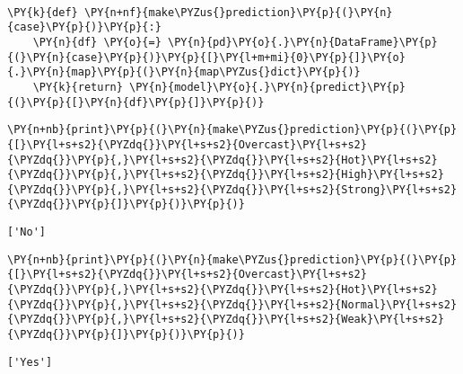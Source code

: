     \begin{center}
    \end{center}
    { \hspace*{\fill} \\}
    
    \begin{tcolorbox}[breakable, size=fbox, boxrule=1pt, pad at break*=1mm,colback=cellbackground, colframe=cellborder]
\begin{Verbatim}[commandchars=\\\{\}]
\PY{k}{def} \PY{n+nf}{make\PYZus{}prediction}\PY{p}{(}\PY{n}{case}\PY{p}{)}\PY{p}{:}
    \PY{n}{df} \PY{o}{=} \PY{n}{pd}\PY{o}{.}\PY{n}{DataFrame}\PY{p}{(}\PY{n}{case}\PY{p}{)}\PY{p}{[}\PY{l+m+mi}{0}\PY{p}{]}\PY{o}{.}\PY{n}{map}\PY{p}{(}\PY{n}{map\PYZus{}dict}\PY{p}{)}
    \PY{k}{return} \PY{n}{model}\PY{o}{.}\PY{n}{predict}\PY{p}{(}\PY{p}{[}\PY{n}{df}\PY{p}{]}\PY{p}{)}
\end{Verbatim}
\end{tcolorbox}

    \begin{tcolorbox}[breakable, size=fbox, boxrule=1pt, pad at break*=1mm,colback=cellbackground, colframe=cellborder]
\begin{Verbatim}[commandchars=\\\{\}]
\PY{n+nb}{print}\PY{p}{(}\PY{n}{make\PYZus{}prediction}\PY{p}{(}\PY{p}{[}\PY{l+s+s2}{\PYZdq{}}\PY{l+s+s2}{Overcast}\PY{l+s+s2}{\PYZdq{}}\PY{p}{,}\PY{l+s+s2}{\PYZdq{}}\PY{l+s+s2}{Hot}\PY{l+s+s2}{\PYZdq{}}\PY{p}{,}\PY{l+s+s2}{\PYZdq{}}\PY{l+s+s2}{High}\PY{l+s+s2}{\PYZdq{}}\PY{p}{,}\PY{l+s+s2}{\PYZdq{}}\PY{l+s+s2}{Strong}\PY{l+s+s2}{\PYZdq{}}\PY{p}{]}\PY{p}{)}\PY{p}{)}
\end{Verbatim}
\end{tcolorbox}

    \begin{Verbatim}[commandchars=\\\{\}]
['No']
    \end{Verbatim}

    \begin{tcolorbox}[breakable, size=fbox, boxrule=1pt, pad at break*=1mm,colback=cellbackground, colframe=cellborder]
\begin{Verbatim}[commandchars=\\\{\}]
\PY{n+nb}{print}\PY{p}{(}\PY{n}{make\PYZus{}prediction}\PY{p}{(}\PY{p}{[}\PY{l+s+s2}{\PYZdq{}}\PY{l+s+s2}{Overcast}\PY{l+s+s2}{\PYZdq{}}\PY{p}{,}\PY{l+s+s2}{\PYZdq{}}\PY{l+s+s2}{Hot}\PY{l+s+s2}{\PYZdq{}}\PY{p}{,}\PY{l+s+s2}{\PYZdq{}}\PY{l+s+s2}{Normal}\PY{l+s+s2}{\PYZdq{}}\PY{p}{,}\PY{l+s+s2}{\PYZdq{}}\PY{l+s+s2}{Weak}\PY{l+s+s2}{\PYZdq{}}\PY{p}{]}\PY{p}{)}\PY{p}{)}
\end{Verbatim}
\end{tcolorbox}

    \begin{Verbatim}[commandchars=\\\{\}]
['Yes']
    \end{Verbatim}


